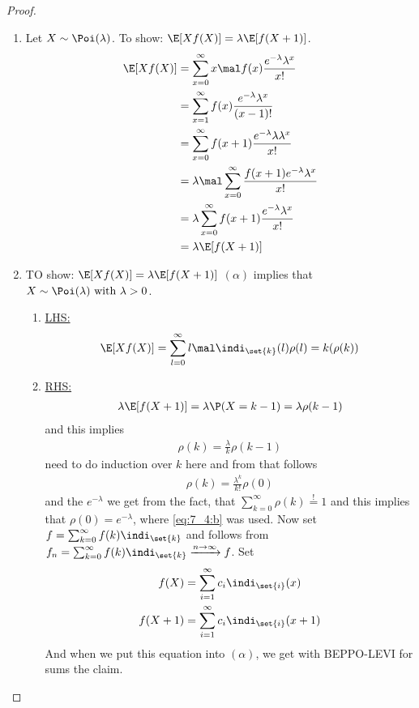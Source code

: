 \subsection{}
\begin{proof}
	\begin{enumerate}
		\item Let $X\sim \Poi(\lambda)$. To show: $\E[Xf(X)] = \lambda \E[f(X+1)]$.
		\begin{align*}
			\E[Xf(X)] &= \sum_{x=0}^{\infty}x\mal f(x)\frac{e^{-\lambda}\lambda^x}{x!}\\
			&= \sum_{x=1}^{\infty} f(x)\frac{e^{-\lambda}\lambda^x}{(x-1)!}\\
			&= \sum_{x=0}^{\infty}f(x+1)\frac{e^{-\lambda}\lambda\lambda^x}{x!}\\
			&= \lambda \mal \sum_{x=0}^{\infty} \frac{f(x+1)e^{-\lambda}\lambda^x}{x!}\\
			&= \lambda \sum_{x=0}^{\infty} f(x+1)\frac{e^{-\lambda}\lambda^x}{x!}\\
			&= \lambda\E[f(X+1)]
		\end{align*}
		\item TO show: $\E[Xf(X)] = \lambda \E[f(X+1)]$ $(\alpha)$ implies that $X\sim \Poi(\lambda) \with \lambda >0$.
		\begin{enumerate}
			\item \ul{LHS:} 
			\begin{align*}
				\E[Xf(X)] = \sum_{l=0}^{\infty} l \mal \indi_{\set{k}}(l) \rho(l) = k(\rho(k))
			\end{align*}
			\item \ul{RHS:}
			\begin{align*}
				\lambda\E[f(X+1)] = \lambda \P(X=k-1) = \lambda \rho(k-1)
			\end{align*}
			and this implies
			\begin{align*}
				\rho(k) = \frac{\lambda}{k}\rho(k-1)
			\end{align*}
			need to do induction over $k$ here and from that follows
			\begin{align*}
				\rho(k) = \frac{\lambda^k}{k!}\rho(0) \tag{$\times$}\label{eq:7_4:b}
			\end{align*}
			and the $e^{-\lambda}$ we get from the fact, that $\sum_{k=0}^{\infty} \rho(k) \overset{!}{=} 1$ and this implies that $\rho(0) = e^{-\lambda}$, where \eqref{eq:7_4:b} was used. Now set $f = \sum_{k=0}^{\infty} f(k)\indi_{\set{k}}$ and follows from $f_n = \sum_{k=0}^{\infty} f(k)\indi_{\set{k}} \xrightarrow{n \to \infty} f$. Set
			\begin{align*}
				f(X) &= \sum_{i=1}^{\infty} c_i \indi_{\set{i}}(x)\\
				f(X+1) &= \sum_{i=1}^{\infty} c_i \indi_{\set{i}}(x+1)
			\end{align*}
			And when we put this equation into $(\alpha)$, we get with BEPPO-LEVI for sums the claim.
		\end{enumerate}
	\end{enumerate}
\end{proof}

